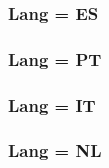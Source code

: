 \documentclass[11pt,a4paper]{ltxdoc}
\begin{document}

\pagebreak

\subsubsection{Lang = ES}


\pagebreak

\subsubsection{Lang = PT}


\pagebreak

\subsubsection{Lang = IT}


\pagebreak

\subsubsection{Lang = NL}

\end{document}
